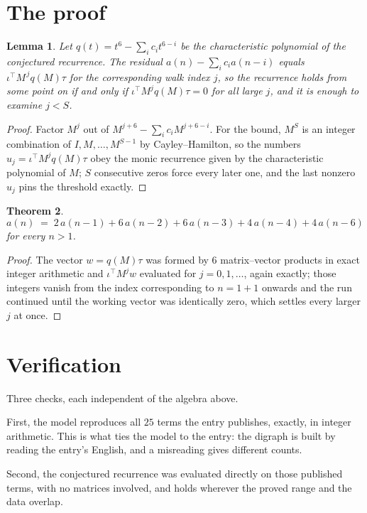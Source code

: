 \documentclass[11pt,a4paper]{article}
\theoremstyle{plain}
\newtheorem{theorem}{Theorem}
\newtheorem{lemma}[theorem]{Lemma}
\theoremstyle{definition}
\begin{document}
\section{The proof}

\begin{lemma}\label{lem:crit}
Let $q(t)=t^{6}-\sum_i c_it^{6-i}$ be the characteristic polynomial of the
conjectured recurrence. The residual $a(n)-\sum_ic_ia(n-i)$ equals
$\iota^{\!\top}M^{\,j}q(M)\tau$ for the corresponding walk index $j$, so the recurrence
holds from some point on if and only if $\iota^{\!\top}M^{j}q(M)\tau=0$ for all large $j$,
and it is enough to examine $j<S$.
\end{lemma}

\begin{proof}
Factor $M^{j}$ out of $M^{j+6}-\sum_ic_iM^{j+6-i}$. For the bound, $M^{S}$
is an integer combination of $I,M,\dots,M^{S-1}$ by Cayley--Hamilton, so the numbers
$u_j=\iota^{\!\top}M^{j}q(M)\tau$ obey the monic recurrence given by the characteristic
polynomial of $M$; $S$ consecutive zeros force every later one, and the last nonzero $u_j$
pins the threshold exactly.
\end{proof}

\begin{theorem}
\[
a(n)\;=\;2\,a(n-1) + 6\,a(n-2) + 6\,a(n-3) + 4\,a(n-4) + 4\,a(n-6)
\]
for every $n>1$.
\end{theorem}

\begin{proof}
The vector $w=q(M)\tau$ was formed by $6$ matrix--vector products in exact integer
arithmetic and $\iota^{\!\top}M^{j}w$ evaluated for $j=0,1,\dots$, again exactly; those
integers vanish from the index corresponding to $n=1+1$ onwards and the run continued
until the working vector was identically zero, which settles every larger $j$ at once.
\end{proof}

\section{Verification}

Three checks, each independent of the algebra above.

First, the model reproduces all $25$ terms the entry publishes, exactly, in integer
arithmetic. This is what ties the model to the entry: the digraph is built by reading the
entry's English, and a misreading gives different counts.

Second, the conjectured recurrence was evaluated directly on those published terms, with no
matrices involved, and holds wherever the proved range and the data overlap.
\end{document}
